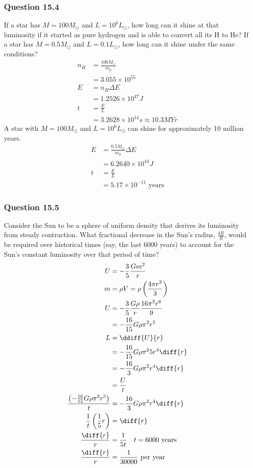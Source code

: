 \documentclass{math}
\begin{document}
\subsubsection*{Question 15.4}
If a star has \( M = 100M_{\odot} \) and \( L = 10^6L_{\odot} \), how long can
it shine at that luminosity if it started as pure hydrogen and is able to
convert all its H to He? If a star has \( M = 0.5M_{\odot} \) and
\( L = 0.1L_{\odot} \), how long can it shine under the same conditions?
\begin{align*}
  n_H &= \frac{100M_{\odot}}{m_p} \\
  &= 3.055\times10^{55} \\
  E &= n_H\Delta E \\
  &= 1.2526\times10^{47}J \\
  t &= \frac{E}{L} \\
  &= 3.2628\times10^{14}s \approx 10.3MYr
\end{align*}
A star with \( M = 100M_{\odot} \) and \( L = 10^6L_{\odot} \) can shine for
approximately 10 million years.
\begin{align*}
  E &= \frac{0.5M_{\odot}}{m_p}\Delta E \\
  &= 6.2640\times10^{44}J \\
  t &= \frac{E}{L} \\
  &= 5.17\times10^{-11}\text{ years}
\end{align*}

\subsubsection*{Question 15.5}
Consider the Sun to be a sphere of uniform density that derives its luminosity
from steady contraction. What fractional decrease in the Sun's radius,
\( \frac{\delta R}{R} \), would be required over historical times (say, the
last 6000 years) to account for the Sun's constant luminosity over that period
of time?
\begin{align*}
  U &= -\frac{3}{5}\frac{Gm^2}{r} \\
  m &= \rho V = \rho\left(\frac{4\pi r^3}{3}\right) \\
  U &= -\frac{3}{5}\frac{G\rho}{r}\frac{16\pi^2r^6}{9} \\
  &= -\frac{16}{15}G\rho\pi^2r^5 \\
  L &= \ddiff{U}{r} \\
  &= -\frac{16}{15}G\rho\pi^25r^4\diff{r} \\
  &= -\frac{16}{3}G\rho\pi^2r^4\diff{r} \\
  &= \frac{U}{t} \\
  \frac{\left(-\frac{16}{15}G\rho\pi^2r^5\right)}{t} &=
    -\frac{16}{3}G\rho\pi^2r^4\diff{r} \\
  \frac{1}{t}\left(\frac{1}{5}r\right) &= \diff{r} \\
  \frac{\diff{r}}{r} &= \frac{1}{5t} \quad t = 6000\text{ years} \\
  \frac{\diff{r}}{r} &= \frac{1}{30000}\text{ per year}
\end{align*}
\end{document}
